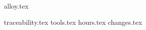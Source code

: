 \documentclass[a4paper,11pt]{article}
\begin{document}
{alloy.tex}

{traceability.tex}
{tools.tex}
{hours.tex}
{changes.tex}

\end{document}
